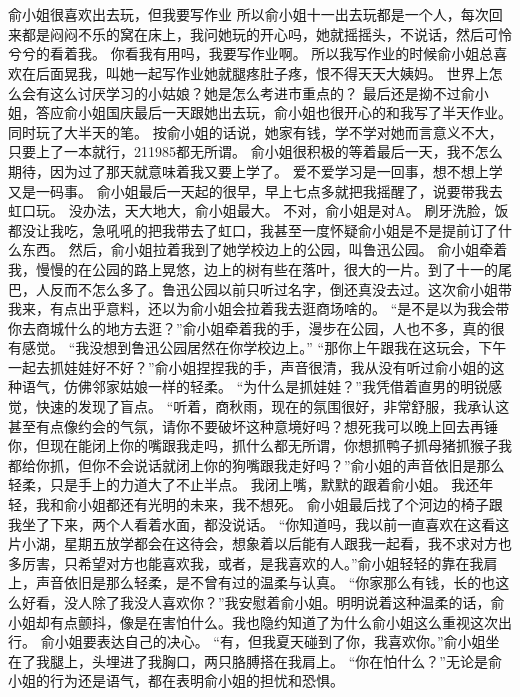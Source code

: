 \chapter{}
俞小姐很喜欢出去玩，但我要写作业 所以俞小姐十一出去玩都是一个人，每次回来都是闷闷不乐的窝在床上，我问她玩的开心吗，她就摇摇头，不说话，然后可怜兮兮的看着我。
你看我有用吗，我要写作业啊。
所以我写作业的时候俞小姐总喜欢在后面晃我，叫她一起写作业她就腿疼肚子疼，恨不得天天大姨妈。
世界上怎么会有这么讨厌学习的小姑娘？她是怎么考进市重点的？
最后还是拗不过俞小姐，答应俞小姐国庆最后一天跟她出去玩，俞小姐也很开心的和我写了半天作业。
同时玩了大半天的笔。
按俞小姐的话说，她家有钱，学不学对她而言意义不大，只要上了一本就行，211985都无所谓。
俞小姐很积极的等着最后一天，我不怎么期待，因为过了那天就意味着我又要上学了。
爱不爱学习是一回事，想不想上学又是一码事。
俞小姐最后一天起的很早，早上七点多就把我摇醒了，说要带我去虹口玩。
没办法，天大地大，俞小姐最大。
不对，俞小姐是对A。
刷牙洗脸，饭都没让我吃，急吼吼的把我带去了虹口，我甚至一度怀疑俞小姐是不是提前订了什么东西。
然后，俞小姐拉着我到了她学校边上的公园，叫鲁迅公园。
俞小姐牵着我，慢慢的在公园的路上晃悠，边上的树有些在落叶，很大的一片。到了十一的尾巴，人反而不怎么多了。鲁迅公园以前只听过名字，倒还真没去过。这次俞小姐带我来，有点出乎意料，还以为俞小姐会拉着我去逛商场啥的。
“是不是以为我会带你去商城什么的地方去逛？”俞小姐牵着我的手，漫步在公园，人也不多，真的很有感觉。
“我没想到鲁迅公园居然在你学校边上。”
“那你上午跟我在这玩会，下午一起去抓娃娃好不好？”俞小姐捏捏我的手，声音很清，我从没有听过俞小姐的这种语气，仿佛邻家姑娘一样的轻柔。
“为什么是抓娃娃？”我凭借着直男的明锐感觉，快速的发现了盲点。
“听着，商秋雨，现在的氛围很好，非常舒服，我承认这甚至有点像约会的气氛，请你不要破坏这种意境好吗？想死我可以晚上回去再锤你，但现在能闭上你的嘴跟我走吗，抓什么都无所谓，你想抓鸭子抓母猪抓猴子我都给你抓，但你不会说话就闭上你的狗嘴跟我走好吗？”俞小姐的声音依旧是那么轻柔，只是手上的力道大了不止半点。
我闭上嘴，默默的跟着俞小姐。
我还年轻，我和俞小姐都还有光明的未来，我不想死。
俞小姐最后找了个河边的椅子跟我坐了下来，两个人看着水面，都没说话。
“你知道吗，我以前一直喜欢在这看这片小湖，星期五放学都会在这待会，想象着以后能有人跟我一起看，我不求对方也多厉害，只希望对方也能喜欢我，或者，是我喜欢的人。”俞小姐轻轻的靠在我肩上，声音依旧是那么轻柔，是不曾有过的温柔与认真。
“你家那么有钱，长的也这么好看，没人除了我没人喜欢你？”我安慰着俞小姐。明明说着这种温柔的话，俞小姐却有点颤抖，像是在害怕什么。我也隐约知道了为什么俞小姐这么重视这次出行。
俞小姐要表达自己的决心。
“有，但我夏天碰到了你，我喜欢你。”俞小姐坐在了我腿上，头埋进了我胸口，两只胳膊搭在我肩上。
“你在怕什么？”无论是俞小姐的行为还是语气，都在表明俞小姐的担忧和恐惧。
